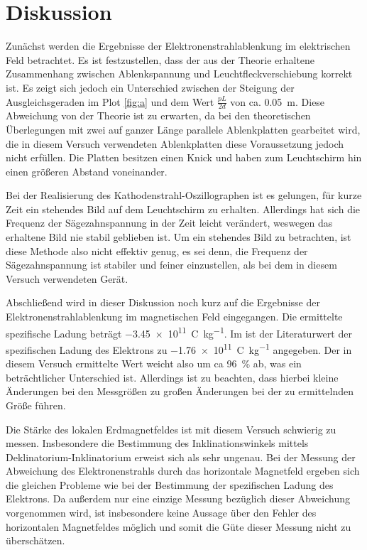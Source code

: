 
\section{Diskussion}
Zunächst werden die Ergebnisse der Elektronenstrahlablenkung im elektrischen Feld betrachtet. Es ist festzustellen, dass der aus der Theorie erhaltene Zusammenhang zwischen Ablenkspannung und Leuchtfleckverschiebung korrekt ist. Es zeigt sich jedoch ein Unterschied zwischen der Steigung der Ausgleichsgeraden im Plot \ref{fig:a} und dem Wert $\frac{pL}{2d}$ von ca. \SI{0.05}{\metre}. Diese Abweichung von der Theorie ist zu erwarten, da bei den theoretischen Überlegungen mit zwei auf ganzer Länge parallele Ablenkplatten gearbeitet wird, die in diesem Versuch verwendeten Ablenkplatten diese Voraussetzung jedoch nicht erfüllen. Die Platten besitzen einen Knick und haben zum Leuchtschirm hin einen größeren Abstand voneinander. 

Bei der Realisierung des Kathodenstrahl-Oszillographen ist es gelungen, für kurze Zeit ein stehendes Bild auf dem Leuchtschirm zu erhalten. Allerdings hat sich die Frequenz der Sägezahnspannung in der Zeit leicht verändert, weswegen das erhaltene Bild nie stabil geblieben ist. Um ein stehendes Bild zu betrachten, ist diese Methode also nicht effektiv genug, es sei denn, die Frequenz der Sägezahnspannung ist stabiler und feiner einzustellen, als bei dem in diesem Versuch verwendeten Gerät.

Abschließend wird in dieser Diskussion noch kurz auf die Ergebnisse der Elektronenstrahlablenkung im magnetischen Feld eingegangen. Die ermittelte spezifische Ladung beträgt \SI{-3.45e11}{\coulomb\per\kilo\gram}. Im \textcite{demtroeder_band 1} ist der Literaturwert der spezifischen Ladung des Elektrons zu \SI{-1.76e11}{\coulomb\per\kilo\gram} angegeben. Der in diesem Versuch ermittelte Wert weicht also um ca \SI{96}{\percent} ab, was ein beträchtlicher Unterschied ist. Allerdings ist zu beachten, dass hierbei kleine Änderungen bei den Messgrößen zu großen Änderungen bei der zu ermittelnden Größe führen.

Die Stärke des lokalen Erdmagnetfeldes ist mit diesem Versuch schwierig zu messen. Insbesondere die Bestimmung des Inklinationswinkels mittels Deklinatorium-Inklinatorium erweist sich als sehr ungenau. Bei der Messung der Abweichung des Elektronenstrahls durch das horizontale Magnetfeld ergeben sich die gleichen Probleme wie bei der Bestimmung der spezifischen Ladung des Elektrons. Da außerdem nur eine einzige Messung bezüglich dieser Abweichung vorgenommen wird, ist insbesondere keine Aussage über den Fehler des horizontalen Magnetfeldes möglich und somit die Güte dieser Messung nicht zu überschätzen.